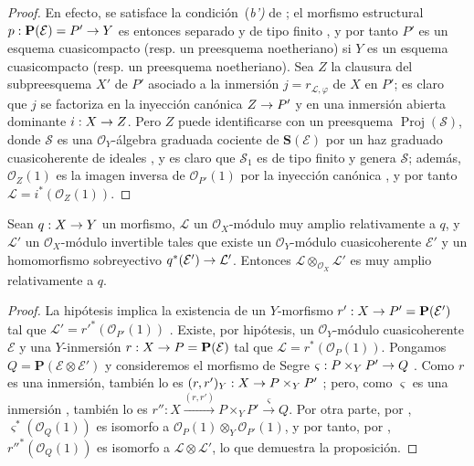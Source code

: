 \documentclass[oneside,10pt]{amsart}
\makeatletter
\newcommand{\ega@arrow}[2]{\mathchoice{#1}{#2}{#2}{#2}}
\renewcommand{\to}{\ega@arrow{\longrightarrow}{\rightarrow}}
\newcommand{\oldpage}[2][]{\marginnote{\normalfont\footnotesize\textbf{#1}~|~#2}\ignorespaces}
\let\EGAOriginalLabel\label
\renewcommand{\label}[1]{\phantomsection\EGAOriginalLabel{#1}}
\makeatother
\begin{document}
\begin{proof}
En efecto, se satisface la condición~(\emph{b')} de ;
el morfismo estructural $p:\mathbf{P}(\mathcal{E})=P'\to Y$ es entonces separado y de tipo finito , y por tanto $P'$ es un esquema cuasicompacto (resp. un preesquema noetheriano) si $Y$ es un esquema cuasicompacto (resp. un preesquema noetheriano).
Sea $Z$ la clausura  del subpreesquema $X'$ de $P'$ asociado a la inmersión $j=r_{\mathcal{L},\varphi}$ de $X$ en $P'$;
es claro que $j$ se factoriza en la inyección canónica $Z\to P'$ y en una inmersión abierta dominante $i:X\to Z$.
Pero $Z$ puede identificarse con un preesquema $\operatorname{Proj}(\mathcal{S})$, donde $\mathcal{S}$ es una $\mathcal{O}_Y$-álgebra graduada cociente de $\mathbf{S}(\mathcal{E})$ por un haz graduado cuasicoherente de ideales , y es claro que $\mathcal{S}_1$ es de tipo finito y genera $\mathcal{S}$;
además, $\mathcal{O}_Z(1)$ es la imagen inversa de $\mathcal{O}_{P'}(1)$ por la inyección canónica , y por tanto $\mathcal{L}=i^*(\mathcal{O}_Z(1))$.
\end{proof}

\begin{proposition}[4.4.8]
\label{II.4.4.8-fr}
Sean $q:X\to Y$ un morfismo, $\mathcal{L}$ un $\mathcal{O}_X$-módulo muy amplio relativamente a $q$, y $\mathcal{L}'$ un $\mathcal{O}_X$-módulo invertible tales que existe un $\mathcal{O}_Y$-módulo cuasicoherente $\mathcal{E}'$ y un homomorfismo sobreyectivo $q^*(\mathcal{E}')\to\mathcal{L}'$.
Entonces $\mathcal{L}\otimes_{\mathcal{O}_X}\mathcal{L}'$ es muy amplio relativamente a $q$.
\end{proposition}

\begin{proof}
La hipótesis implica la existencia de un $Y$-morfismo $r':X\to P'=\mathbf{P}(\mathcal{E}')$ tal que $\mathcal{L}'=r'^*(\mathcal{O}_{P'}(1))$ .
Existe, por hipótesis, un $\mathcal{O}_Y$-módulo cuasicoherente $\mathcal{E}$ y una
\oldpage[II]{81}
$Y$-inmersión $r:X\to P=\mathbf{P}(\mathcal{E})$ tal que $\mathcal{L}=r^*(\mathcal{O}_P(1))$.
Pongamos $Q=\mathbf{P}(\mathcal{E}\otimes\mathcal{E}')$ y consideremos el morfismo de Segre $\varsigma:P\times_YP'\to Q$ .
Como $r$ es una inmersión, también lo es $(r,r')_Y:X\to P\times_YP'$ ;
pero, como $\varsigma$ es una inmersión , también lo es $r'':X\xrightarrow{(r,r')}P\times_YP'\xrightarrow{\varsigma}Q$.
Por otra parte, por , $\varsigma^*(\mathcal{O}_Q(1))$ es isomorfo a $\mathcal{O}_P(1)\otimes_Y\mathcal{O}_{P'}(1)$, y por tanto, por , $r''^*(\mathcal{O}_Q(1))$ es isomorfo a $\mathcal{L}\otimes\mathcal{L}'$, lo que demuestra la proposición.
\end{proof}
\end{document}
